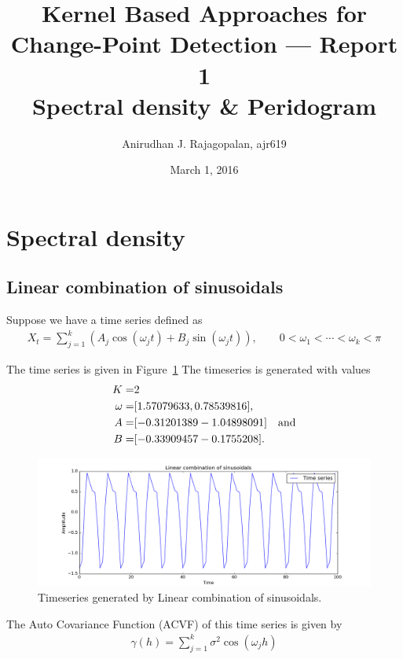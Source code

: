 \documentclass{article}
\begin{document}
\title{Kernel Based Approaches for Change-Point Detection --- Report 1 \\ Spectral density \& Peridogram}
\date{March 1, 2016}
\author{Anirudhan J. Rajagopalan, ajr619}

\maketitle

\newpage

\section{Spectral density}
\subsection{Linear combination of sinusoidals}
Suppose we have a time series defined as 
\begin{align}
  X_{t} = \sum_{j = 1}^{k} (A_{j} \cos(\omega_{j}t) + B_{j} \sin(\omega_{j}t)), \qquad 0 < \omega_{1} < \cdots < \omega_{k} < \pi
\end{align}

The time series is given in Figure~\ref{fig:sd2_ts} The timeseries is generated with values 
\begin{align*}
  K =& 2\\ 
  \omega =& [ 1.57079633, 0.78539816],\\
  A =& [-0.31201389 -1.04898091] \text{\quad and} \\
  B =& [-0.33909457 -0.1755208 ].
\end{align*}

\begin{figure}[ht!]
  \centering
  \includegraphics[width=1\textwidth]{images/spectral_density_2/ts}
  \caption{Timeseries generated by Linear combination of sinusoidals.~\label{fig:sd2_ts}}
\end{figure}

The Auto Covariance Function (ACVF) of this time series is given by
\begin{align}
  \gamma(h) = \sum_{j=1}^{k} \sigma^{2}\cos(\omega_{j}h)
\end{align}
\end{document}
